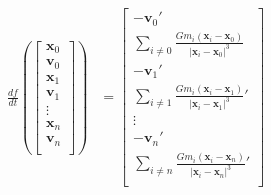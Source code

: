 \documentclass[12pt,letterpaper]{article}
\newcommand{\vex}{\bm{x}}
\newcommand{\vev}{\bm{v}}
\begin{document}
    \begin{align*}
        \frac{df}{dt}(\left[\begin{matrix}
            \vex_0\\\vev_0\\
            \vex_1\\\vev_1\\
            \vdots\\
            \vex_n\\\vev_n\\
        \end{matrix}\right])
        &=
        \left[\begin{matrix}
            -\vev_0'\\\sum_{i\neq 0}\frac{Gm_i(\vex_i-\vex_0)}{|\vex_i-\vex_0|^3}\\
            -\vev_1'\\\sum_{i\neq 1}\frac{Gm_i(\vex_i-\vex_1)}{|\vex_i-\vex_1|^3}'\\
            \vdots\\
            -\vev_n'\\\sum_{i\neq n}\frac{Gm_i(\vex_i-\vex_n)}{|\vex_i-\vex_n|^3}'\\
        \end{matrix}\right]\\
    \end{align*}
\end{document}
